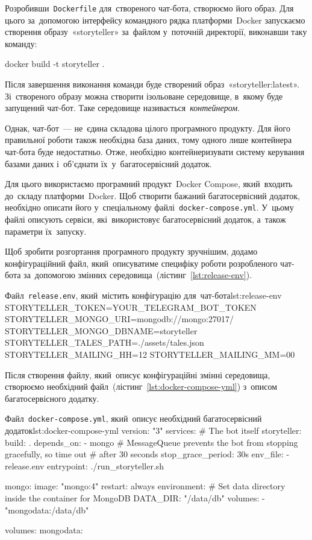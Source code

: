 \documentclass[
	a4paper,
	oneside,
	BCOR = 10mm,
	DIV = 12,
	12pt,
	headings = normal,
]{scrartcl}
\newcommand{\filename}[1]{\texttt{#1}}
\begin{document}
			Розробивши~\filename{\textenglish{Dockerfile}} для~створеного чат-бота, створюємо його образ. Для цього за~допомогою інтерфейсу командного рядка платформи~\textenglish{Docker} запускаємо створення образу~«\textenglish{storyteller}» за~файлом у~поточній директорії, виконавши таку команду:
			\begin{bashterm}
				docker build -t storyteller .
			\end{bashterm}
			Після завершення виконання команди буде створений образ~«\textenglish{storyteller:latest}». Зі~створеного образу можна створити ізольоване середовище, в~якому буде запущений чат-бот. Таке середовище називається~\emph{контейнером}.

			Однак, чат-бот~— не~єдина складова цілого програмного продукту. Для його правильної роботи також необхідна база даних, тому одного лише контейнера чат-бота буде недостатньо. Отже, необхідно контейнеризувати систему керування базами даних і~об'єднати їх~у~багатосервісний додаток.

			Для цього використаємо програмний продукт~\textenglish{Docker Compose}, який~входить до~складу платформи~\textenglish{Docker}. Щоб створити бажаний багатосервісний додаток, необхідно описати його у~спеціальному файлі~\filename{\textenglish{docker-compose.yml}}. У~цьому файлі описують сервіси, які~використовує багатосервісний додаток, а~також параметри їх~запуску.

			Щоб зробити розгортання програмного продукту зручнішим, додамо конфігураційний файл, який~описуватиме специфіку роботи розробленого чат-бота за~допомогою змінних середовища~(лістинг~\ref{lst:release-env}).

			\begin{listingplaintext}{Файл~\filename{\textenglish{release.env}}, який~містить конфігурацію для~чат-бота}{lst:release-env}
STORYTELLER_TOKEN=YOUR_TELEGRAM_BOT_TOKEN
STORYTELLER_MONGO_URI=mongodb://mongo:27017/
STORYTELLER_MONGO_DBNAME=storyteller
STORYTELLER_TALES_PATH=./assets/tales.json
STORYTELLER_MAILING_HH=12
STORYTELLER_MAILING_MM=00
			\end{listingplaintext}
			
			Після створення файлу, який~описує конфігураційні змінні середовища, створюємо необхідний файл~(лістинг~\ref{lst:docker-compose-yml}) з~описом багатосервісного додатку.

			\begin{listingdockercompose}{Файл~\filename{\textenglish{docker-compose.yml}}, який~описує необхідний багатосервісний додаток}{lst:docker-compose-yml}
version: "3"
services:
  # The bot itself
  storyteller:
    build: .
    depends_on:
      - mongo
    # MessageQueue prevents the bot from stopping gracefully, so time out
    # after 30 seconds
    stop_grace_period: 30s
    env_file:
      - release.env
    entrypoint: ./run_storyteller.sh

  mongo:
    image: "mongo:4"
    restart: always
    environment:
      # Set data directory inside the container for MongoDB
      DATA_DIR: "/data/db"
    volumes:
      - "mongodata:/data/db"

volumes:
  mongodata:
			\end{listingdockercompose}
\end{document}

